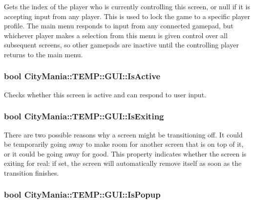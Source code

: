 Gets the index of the player who is currently controlling this screen, or null if it is accepting input from any player. This is used to lock the game to a specific player profile. The main menu responds to input from any connected gamepad, but whichever player makes a selection from this menu is given control over all subsequent screens, so other gamepads are inactive until the controlling player returns to the main menu. \hypertarget{classCityMania_1_1TEMP_1_1GUI_a7467928ea1b1170ed3f96778300d0620}{
\subsubsection[{IsActive}]{\setlength{\rightskip}{0pt plus 5cm}bool CityMania::TEMP::GUI::IsActive}}
\label{classCityMania_1_1TEMP_1_1GUI_a7467928ea1b1170ed3f96778300d0620}


Checks whether this screen is active and can respond to user input. \hypertarget{classCityMania_1_1TEMP_1_1GUI_a5ed6f265759f7b180e6b8774fedb71b5}{
\subsubsection[{IsExiting}]{\setlength{\rightskip}{0pt plus 5cm}bool CityMania::TEMP::GUI::IsExiting}}
\label{classCityMania_1_1TEMP_1_1GUI_a5ed6f265759f7b180e6b8774fedb71b5}


There are two possible reasons why a screen might be transitioning off. It could be temporarily going away to make room for another screen that is on top of it, or it could be going away for good. This property indicates whether the screen is exiting for real: if set, the screen will automatically remove itself as soon as the transition finishes. \hypertarget{classCityMania_1_1TEMP_1_1GUI_aba780c16bbff79f84ce296b5139a0571}{
\subsubsection[{IsPopup}]{\setlength{\rightskip}{0pt plus 5cm}bool CityMania::TEMP::GUI::IsPopup}}
\label{classCityMania_1_1TEMP_1_1GUI_aba780c16bbff79f84ce296b5139a0571}


